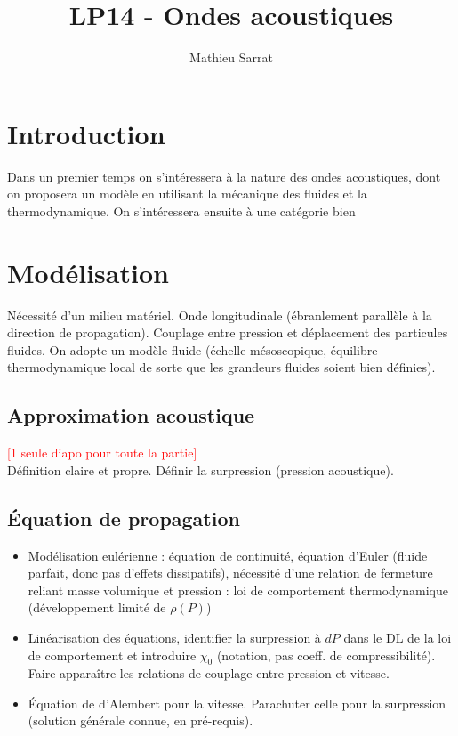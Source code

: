 \documentclass[11pt,a4paper]{report}
\author{Mathieu Sarrat}
\title{LP14 - Ondes acoustiques}
\begin{document}
\maketitle

\section*{Introduction} 

Dans un premier temps on s'intéressera à la nature des ondes acoustiques, dont on proposera un modèle en utilisant la mécanique des fluides et la thermodynamique. On s'intéressera ensuite à une catégorie bien 

\section{Modélisation}\label{sec:1}
Nécessité d'un milieu matériel. Onde longitudinale (ébranlement parallèle à la direction de propagation). Couplage entre pression et déplacement des particules fluides. On adopte un modèle fluide (échelle mésoscopique, équilibre thermodynamique local de sorte que les grandeurs fluides soient bien définies).

\subsection{Approximation acoustique}
\textcolor{red}{[1 seule diapo pour toute la partie]}\\
Définition claire et propre. Définir la surpression (pression acoustique).

\subsection{Équation de propagation}
\begin{itemize}
	\item Modélisation eulérienne : équation de continuité, équation d'Euler (fluide parfait, donc pas d'effets dissipatifs), nécessité d'une relation de fermeture reliant masse volumique et pression : loi de comportement thermodynamique (développement limité de $\rho(P)$)
	\item Linéarisation des équations, identifier la surpression à $dP$ dans le DL de la loi de comportement et introduire $\chi_0$ (notation, pas coeff. de compressibilité). Faire apparaître les relations de couplage entre pression et vitesse.
	\item Équation de d'Alembert pour la vitesse. Parachuter celle pour la surpression (solution générale connue, en pré-requis).
\end{itemize}
\end{document}
